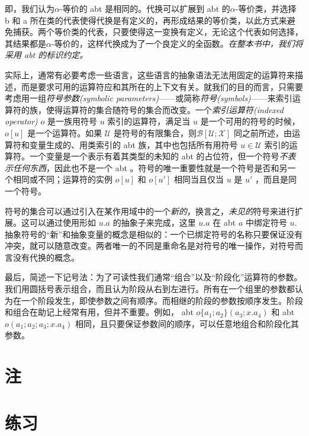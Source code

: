 即，我们认为$\alpha$-等价的 abt 是相同的。代换可以扩展到 abt 的$\alpha$-等价类，并选择
b 和 a
所在类的代表使得代换是有定义的，再形成结果的等价类，以此方式来避免捕获。两个等价类的代表，只要使得这一变换有定义，无论这个代表如何选择，其结果都是$\alpha$-等价的，这样代换成为了一个良定义的全函数。\emph{在整本书中，我们将采用
abt 的标识约定。}

实际上，通常有必要考虑一些语言，这些语言的抽象语法无法用固定的运算符来描述，而是要求可用的运算符应和其所在的上下文有关。就我们的目的而言，只需要考虑用一组\emph{符号参数(symbolic
parameters)}------或简称\emph{符号(symbols)}------来索引运算符的族，使得运算符的集合随符号的集合而改变。一个\emph{索引运算符(indexed
operator)} \(o\) 是一族用符号 \(u\) 索引的运算符，满足当 \(u\)
是一个可用的符号的时候，\(o[u]\) 是一个运算符。如果 \(\mathcal{U}\)
是符号的有限集合，则\(\mathcal{B[U;X]}\)
同之前所述，由运算符和变量生成的、用类索引的 abt
族，其中也包括所有用符号 \(u\in \mathcal{U}\)
索引的运算符。一个变量是一个表示有着其类型的未知的 abt
的占位符，但一个符号\emph{不表示任何东西}，因此也不是一个 abt
。符号的唯一重要性就是一个符号是否和另一个相同或不同；运算符的实例
\(o[u]\) 和 \(o[u']\) 相同当且仅当 \(u\) 是 \(u'\) ，而且是同一个符号。

符号的集合可以通过引入在某作用域中的一个\emph{新的}，换言之，\emph{未见的}符号来进行扩展。这可以通过使用形如
\(u.a\) 的抽象子来完成，这里 \(u.a\) 在 abt \(a\) 中绑定符号 \(u\).
抽象符号的``新''和抽象变量的概念是相似的：一个已绑定符号的名称只要保证没有冲突，就可以随意改变。两者唯一的不同是重命名是对符号的唯一操作，对符号而言没有代换的概念。

最后，简述一下记号法：为了可读性我们通常``组合''以及``阶段化''运算符的参数。我们用圆括号表示组合，而且认为阶段从右到左进行。所有在一个组里的参数都认为在一个阶段发生，即使参数之间有顺序。而相继的阶段的参数按顺序发生。阶段和组合在助记上经常有用，但并不重要。例如，
abt \(o\{a_1;a_2\}(a_3;x.a_4)\) 和 abt \(o(a_1;a_2;a_3;x.a_4)\)
相同，且只要保证参数间的顺序，可以任意地组合和阶段化其参数。

\section{注}

\section{练习}

